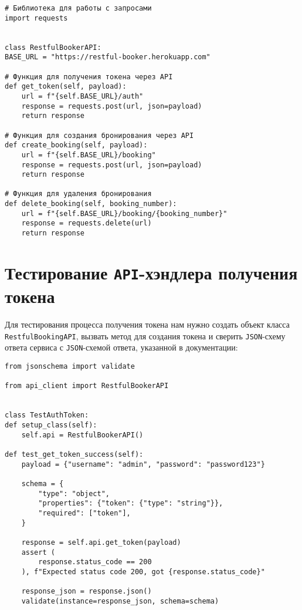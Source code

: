 \begin{verbatim}
# Библиотека для работы с запросами
import requests


class RestfulBookerAPI:
BASE_URL = "https://restful-booker.herokuapp.com"

# Функция для получения токена через API
def get_token(self, payload):
    url = f"{self.BASE_URL}/auth"
    response = requests.post(url, json=payload)
    return response

# Функция для создания бронирования через API
def create_booking(self, payload):
    url = f"{self.BASE_URL}/booking"
    response = requests.post(url, json=payload)
    return response

# Функция для удаления бронирования
def delete_booking(self, booking_number):
    url = f"{self.BASE_URL}/booking/{booking_number}"
    response = requests.delete(url)
    return response
\end{verbatim}

\section{Тестирование \texttt{API}-хэндлера получения токена}

Для тестирования процесса получения токена нам нужно создать объект класса \texttt{RestfulBookingAPI}, вызвать метод для создания токена и сверить \texttt{JSON}-схему ответа сервиса с \texttt{JSON}-схемой ответа, указанной в документации:

\begin{verbatim}
from jsonschema import validate

from api_client import RestfulBookerAPI


class TestAuthToken:
def setup_class(self):
    self.api = RestfulBookerAPI()

def test_get_token_success(self):
    payload = {"username": "admin", "password": "password123"}

    schema = {
        "type": "object",
        "properties": {"token": {"type": "string"}},
        "required": ["token"],
    }

    response = self.api.get_token(payload)
    assert (
        response.status_code == 200
    ), f"Expected status code 200, got {response.status_code}"

    response_json = response.json()
    validate(instance=response_json, schema=schema)
\end{verbatim}

